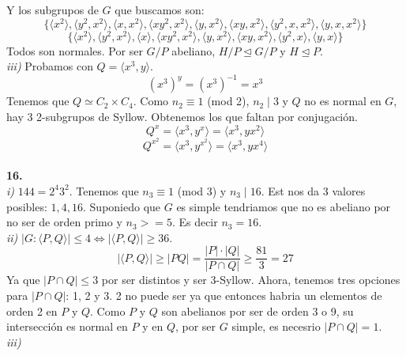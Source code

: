 \documentclass{article}
\begin{document}
Y los subgrupos de $G$ que buscamos son:
$$
\{
\langle x^2 \rangle,
\langle y^2, x^2 \rangle,
\langle x, x^2 \rangle,
\langle xy^2, x^2 \rangle,
\langle y, x^2 \rangle,
\langle xy, x^2 \rangle,
\langle y^2, x, x^2 \rangle,
\langle y, x , x^2 \rangle
\}
$$
$$
\{
\langle x^2 \rangle,
\langle y^2, x^2 \rangle,
\langle x \rangle,
\langle xy^2, x^2 \rangle,
\langle y, x^2 \rangle,
\langle xy, x^2 \rangle,
\langle y^2, x \rangle,
\langle y, x \rangle
\}
$$
Todos son normales. Por ser $G/P$ abeliano, $H/P\trianglelefteq G/P$ y $H\trianglelefteq P$.\\
\textit{iii)} Probamos con $Q = \langle x^3, y \rangle$.
$$
(x^3)^y = (x^3)^{-1} = x^3
$$
Tenemos que $Q \simeq C_2 \times C_4$. Como $n_2 \equiv 1$ (mod 2), $n_2\mid 3$ y $Q$ no es normal en $G$, hay 3 2-subgrupos de Syllow. Obtenemos los que faltan por conjugación.
$$
Q^x = \langle x^3, y^{x} \rangle = \langle x^3, yx^2 \rangle
$$
$$
Q^{x^2} = \langle x^3, y^{x^2} \rangle = \langle x^3, yx^4 \rangle
$$
\\
\textbf{16.}\\
\textit{i)} $144 = 2^4 3^2$. Tenemos que $n_3 \equiv 1$ (mod 3) y $n_3\mid 16$. Est nos da 3 valores posibles: $1, 4, 16$. Suponiedo que $G$ es simple tendriamos que no es abeliano por no ser de orden primo y $n_3>= 5$. Es decir $n_3 = 16$.\\
\textit{ii)} $|G : \langle P, Q \rangle | \leq 4 \Leftrightarrow |\langle P, Q \rangle| \geq 36$.
$$
|\langle P, Q \rangle| \ge |PQ| = \frac{|P|\cdot|Q|}{|P\cap Q |} \ge \frac{81}{3} = 27
$$
Ya que $|P\cap Q |\leq 3$ por ser distintos y ser 3-Syllow. Ahora, tenemos tres opciones para $|P\cap Q |$: 1, 2 y 3. 2 no puede ser ya que entonces habria un elementos de orden 2 en $P$ y $Q$. Como $P$ y $Q$ son abelianos por ser de orden 3 o 9, su intersección es normal en $P$ y en $Q$, por ser $G$ simple, es necesrio $|P\cap Q |= 1$.\\
\textit{iii)}
\end{document}
